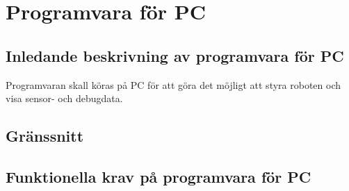 \section{Programvara för PC}

\subsection{Inledande beskrivning av programvara för PC}
Programvaran skall köras på PC för att göra det möjligt att styra roboten och visa sensor- och debugdata.

\subsection{Gränssnitt}
\begin{LIPSkravlista}
\end{LIPSkravlista}

\subsection{Funktionella krav på programvara för PC}
\begin{LIPSkravlista}
\end{LIPSkravlista}
